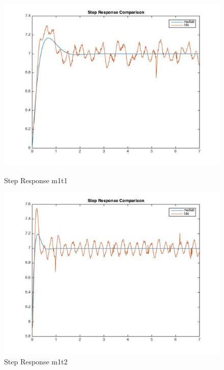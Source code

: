 \documentclass[11pt,titlepage]{article}
\begin{document}
        \begin{figure}[H]
        \centering
        \begin{minipage}{.5\textwidth}
            \centering
            \includegraphics[scale=.4]{stepM1_T1}
            \caption{Step Response m1t1}
            \label{fig:stepM1_T1}
        \end{minipage}%
        \begin{minipage}{.5\textwidth}
            \centering
            \includegraphics[scale=.4]{stepM1_T2}
            \caption{Step Response m1t2}
            \label{fig:stepM1_T2}
        \end{minipage}%
    \end{figure}
\end{document}
